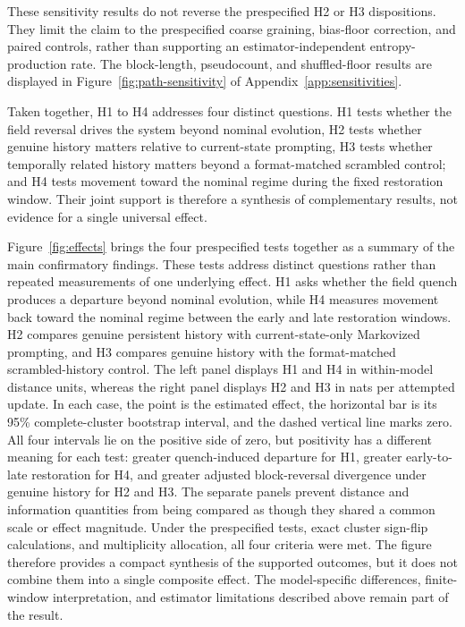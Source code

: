 \documentclass[12pt]{article}
\begin{document}
These sensitivity results do not reverse the prespecified H2 or H3
dispositions. They limit the claim to the prespecified coarse graining,
bias-floor correction, and paired controls, rather than supporting an
estimator-independent entropy-production rate. The block-length, pseudocount,
and shuffled-floor results are displayed in
Figure~\ref{fig:path-sensitivity} of Appendix~\ref{app:sensitivities}.

Taken together, H1 to H4 addresses four distinct questions. H1 tests whether the
field reversal drives the system beyond nominal evolution, H2 tests whether
genuine history matters relative to current-state prompting, H3 tests whether
temporally related history matters beyond a format-matched scrambled control;
and H4 tests movement toward the nominal regime during the fixed restoration
window. Their joint support is therefore a synthesis of complementary results,
not evidence for a single universal effect.


Figure~\ref{fig:effects} brings the four prespecified tests together as a
summary of the main confirmatory findings. These tests address distinct
questions rather than repeated measurements of one underlying effect. H1 asks
whether the field quench produces a departure beyond nominal evolution, while
H4 measures movement back toward the nominal regime between the early and late
restoration windows. H2 compares genuine persistent history with
current-state-only Markovized prompting, and H3 compares genuine history with
the format-matched scrambled-history control.
The left panel displays H1 and H4 in within-model distance units, whereas the
right panel displays H2 and H3 in nats per attempted update. In each case, the
point is the estimated effect, the horizontal bar is its 95\%
complete-cluster bootstrap interval, and the dashed vertical line marks zero.
All four intervals lie on the positive side of zero, but positivity has a
different meaning for each test: greater quench-induced departure for H1,
greater early-to-late restoration for H4, and greater adjusted block-reversal
divergence under genuine history for H2 and H3. The separate panels prevent
distance and information quantities from being compared as though they shared
a common scale or effect magnitude.
Under the prespecified tests, exact cluster sign-flip calculations, and
multiplicity allocation, all four criteria were met. The figure therefore
provides a compact synthesis of the supported outcomes, but it does not combine
them into a single composite effect. The model-specific differences,
finite-window interpretation, and estimator limitations described above remain
part of the result.
\end{document}
